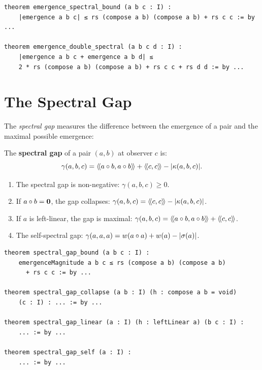 \begin{lstlisting}[caption={Spectral bounds (IDT\_v3\_Emergence.lean)}]
theorem emergence_spectral_bound (a b c : I) :
    |emergence a b c| ≤ rs (compose a b) (compose a b) + rs c c := by ...

theorem emergence_double_spectral (a b c d : I) :
    |emergence a b c + emergence a b d| ≤
    2 * rs (compose a b) (compose a b) + rs c c + rs d d := by ...
\end{lstlisting}


\section{The Spectral Gap}

The \emph{spectral gap} measures the difference between the emergence of a pair
and the maximal possible emergence:

\begin{definition}
\label{def:spectral-gap}
The \textbf{spectral gap} of a pair $(a,b)$ at observer $c$ is:
\[
  \gamma(a,b,c) = \langle\!\langle a \circ b, a \circ b \rangle\!\rangle + \langle\!\langle c, c \rangle\!\rangle - |\kappa(a,b,c)|.
\]
\end{definition}

\begin{theorem}
\label{thm:spectral-gap-properties}
\begin{enumerate}
  \item The spectral gap is non-negative: $\gamma(a,b,c) \geq 0$.
  \item If $a \circ b = \mathbf{0}$, the gap collapses:
    $\gamma(a,b,c) = \langle\!\langle c, c \rangle\!\rangle - |\kappa(a,b,c)|$.
  \item If $a$ is left-linear, the gap is maximal:
    $\gamma(a,b,c) = \langle\!\langle a \circ b, a \circ b \rangle\!\rangle + \langle\!\langle c, c \rangle\!\rangle$.
  \item The self-spectral gap: $\gamma(a,a,a) = w(a \circ a) + w(a) - |\sigma(a)|$.
\end{enumerate}
\end{theorem}

\begin{lstlisting}[caption={Spectral gap (IDT\_v3\_Emergence.lean)}]
theorem spectral_gap_bound (a b c : I) :
    emergenceMagnitude a b c ≤ rs (compose a b) (compose a b)
      + rs c c := by ...

theorem spectral_gap_collapse (a b : I) (h : compose a b = void)
    (c : I) : ... := by ...

theorem spectral_gap_linear (a : I) (h : leftLinear a) (b c : I) :
    ... := by ...

theorem spectral_gap_self (a : I) :
    ... := by ...
\end{lstlisting}


